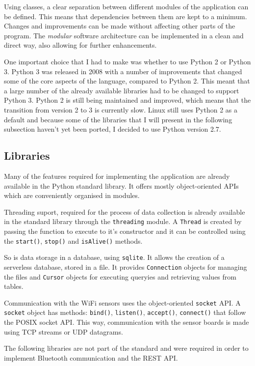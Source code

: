 Using classes, a clear separation between different modules of the application can be defined. This means that dependencies between them are kept to a minimum. Changes and improvements can be made without affecting other parts of the program. The \textit{modular} software architecture can be implemented in a clean and direct way, also allowing for further enhancements.

One important choice that I had to make was whether to use Python 2 or Python 3. Python 3 was released in 2008 with a number of improvements that changed some of the core aspects of the language, compared to Python 2. This meant that a large number of the already available libraries had to be changed to support Python 3. Python 2 is still being maintained and improved, which means that the transition from version 2 to 3 is currently slow. Linux still uses Python 2 as a default and because some of the libraries that I will present in the following subsection haven't yet been ported, I decided to use Python version 2.7.

\subsection{Libraries}

Many of the features required for implementing the application are already available in the Python standard library. It offers mostly object-oriented APIs which are conveniently organised in modules.

Threading suport, required for the process of data collection is already available in the standard library through the \texttt{threading} module. A \texttt{Thread} is created by passing the function to execute to it's constructor and it can be controlled using the \texttt{start()}, \texttt{stop()} and \texttt{isAlive()} methods.

So is data storage in a database, using \texttt{sqlite}. It allows the creation of a serverless database, stored in a file. It provides \texttt{Connection} objects for managing the files and \texttt{Cursor} objects for executing queryies and retrieving values from tables.

Communication with the WiFi sensors uses the object-oriented \texttt{socket} API. A \texttt{socket} object has methods: \texttt{bind()}, \texttt{listen()}, \texttt{accept()}, \texttt{connect()} that follow the POSIX socket API. This way, communication with the sensor boards is made using TCP streams or UDP datagrams.

The following libraries are not part of the standard and were required in order to implement Bluetooth communication and the REST API.

